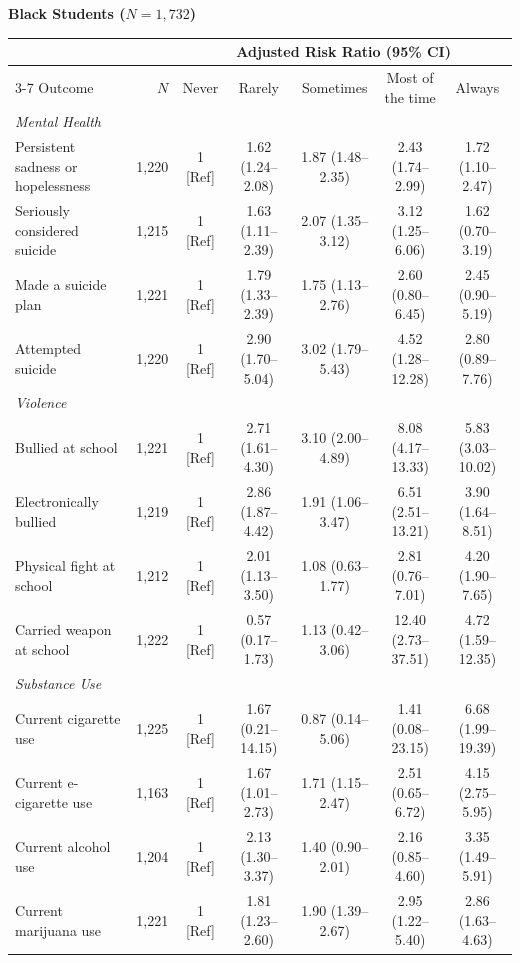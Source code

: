 \documentclass[12pt]{article}
\begin{document}
\begin{landscape}
\nobreak\noindent\textbf{Black Students ($N = 1,732$)}
\nopagebreak\par\nopagebreak\vspace{1pt}\nopagebreak
\nobreak\noindent\begin{tabular}{l r ccccc}
\toprule
 & & \multicolumn{5}{c}{Adjusted Risk Ratio (95\% CI)} \\
\cmidrule(lr){3-7}
Outcome & $N$ & Never & Rarely & Sometimes & Most of the time & Always \\
\midrule
\textit{Mental Health} \\
\quad Persistent sadness or hopelessness & 1,220 & 1 [Ref] & 1.62 (1.24--2.08) & 1.87 (1.48--2.35) & 2.43 (1.74--2.99) & 1.72 (1.10--2.47) \\
\quad Seriously considered suicide & 1,215 & 1 [Ref] & 1.63 (1.11--2.39) & 2.07 (1.35--3.12) & 3.12 (1.25--6.06) & 1.62 (0.70--3.19) \\
\quad Made a suicide plan & 1,221 & 1 [Ref] & 1.79 (1.33--2.39) & 1.75 (1.13--2.76) & 2.60 (0.80--6.45) & 2.45 (0.90--5.19) \\
\quad Attempted suicide & 1,220 & 1 [Ref] & 2.90 (1.70--5.04) & 3.02 (1.79--5.43) & 4.52 (1.28--12.28) & 2.80 (0.89--7.76) \\
\addlinespace[4pt]
\textit{Violence} \\
\quad Bullied at school & 1,221 & 1 [Ref] & 2.71 (1.61--4.30) & 3.10 (2.00--4.89) & 8.08 (4.17--13.33) & 5.83 (3.03--10.02) \\
\quad Electronically bullied & 1,219 & 1 [Ref] & 2.86 (1.87--4.42) & 1.91 (1.06--3.47) & 6.51 (2.51--13.21) & 3.90 (1.64--8.51) \\
\quad Physical fight at school & 1,212 & 1 [Ref] & 2.01 (1.13--3.50) & 1.08 (0.63--1.77) & 2.81 (0.76--7.01) & 4.20 (1.90--7.65) \\
\quad Carried weapon at school & 1,222 & 1 [Ref] & 0.57 (0.17--1.73) & 1.13 (0.42--3.06) & 12.40 (2.73--37.51) & 4.72 (1.59--12.35) \\
\addlinespace[4pt]
\textit{Substance Use} \\
\quad Current cigarette use & 1,225 & 1 [Ref] & 1.67 (0.21--14.15) & 0.87 (0.14--5.06) & 1.41 (0.08--23.15) & 6.68 (1.99--19.39) \\
\quad Current e-cigarette use & 1,163 & 1 [Ref] & 1.67 (1.01--2.73) & 1.71 (1.15--2.47) & 2.51 (0.65--6.72) & 4.15 (2.75--5.95) \\
\quad Current alcohol use & 1,204 & 1 [Ref] & 2.13 (1.30--3.37) & 1.40 (0.90--2.01) & 2.16 (0.85--4.60) & 3.35 (1.49--5.91) \\
\quad Current marijuana use & 1,221 & 1 [Ref] & 1.81 (1.23--2.60) & 1.90 (1.39--2.67) & 2.95 (1.22--5.40) & 2.86 (1.63--4.63) \\
\bottomrule
\end{tabular}\par\vspace{8pt}


\end{landscape}
\end{document}
